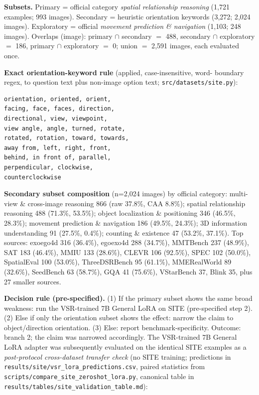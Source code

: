 \textbf{Subsets.} Primary = official category \emph{spatial relationship
reasoning} (1{,}721 examples; 993 images). Secondary = heuristic orientation
keywords (3{,}272; 2{,}024 images). Exploratory = official \emph{movement
prediction \& navigation} (1{,}103; 248 images). Overlaps (image): primary
$\cap$ secondary $=$ 488, secondary $\cap$ exploratory $=$ 186, primary $\cap$
exploratory $=$ 0; union $=$ 2{,}591 images, each evaluated once.

\textbf{Exact orientation-keyword rule} (applied, case-insensitive, word-
boundary regex, to question text plus non-image option text;
\texttt{src/datasets/site.py}):
\begin{verbatim}
orientation, oriented, orient,
facing, face, faces, direction,
directional, view, viewpoint,
view angle, angle, turned, rotate,
rotated, rotation, toward, towards,
away from, left, right, front,
behind, in front of, parallel,
perpendicular, clockwise,
counterclockwise
\end{verbatim}

\textbf{Secondary subset composition} (n=2,024 images) by official category:
multi-view \& cross-image reasoning 866 (raw 37.8\%, CAA 8.8\%); spatial
relationship reasoning 488 (71.3\%, 53.5\%); object localization \& positioning
346 (46.5\%, 28.3\%); movement prediction \& navigation 186 (49.5\%, 24.3\%);
3D information understanding 91 (27.5\%, 0.4\%); counting \& existence 47
(53.2\%, 37.1\%). Top sources: exoego4d 316 (36.4\%), egoexo4d 288 (34.7\%),
MMTBench 237 (48.9\%), SAT 183 (46.4\%), MMIU 133 (28.6\%), CLEVR 106 (92.5\%),
SPEC 102 (50.0\%), SpatialEval 100 (53.0\%), ThreeDSRBench 95 (61.1\%),
MMERealWorld 89 (32.6\%), SeedBench 63 (58.7\%), GQA 41 (75.6\%), VStarBench 37,
Blink 35, plus 27 smaller sources.

\textbf{Decision rule (pre-specified).} (1) If the primary subset shows the same
broad weakness: run the VSR-trained 7B General LoRA on SITE (pre-specified step
2). (2) Else if only the orientation subset shows the effect: narrow the claim
to object/direction orientation. (3) Else: report benchmark-specificity. Outcome:
branch 2; the claim was narrowed accordingly. The VSR-trained 7B General LoRA
adapter was subsequently evaluated on the identical SITE examples as a
\emph{post-protocol cross-dataset transfer check} (no SITE training; predictions
in \texttt{results/site/vsr\_lora\_predictions.csv}, paired statistics from
\texttt{scripts/compare\_site\_zeroshot\_lora.py}, canonical table in
\texttt{results/tables/site\_validation\_table.md}):

